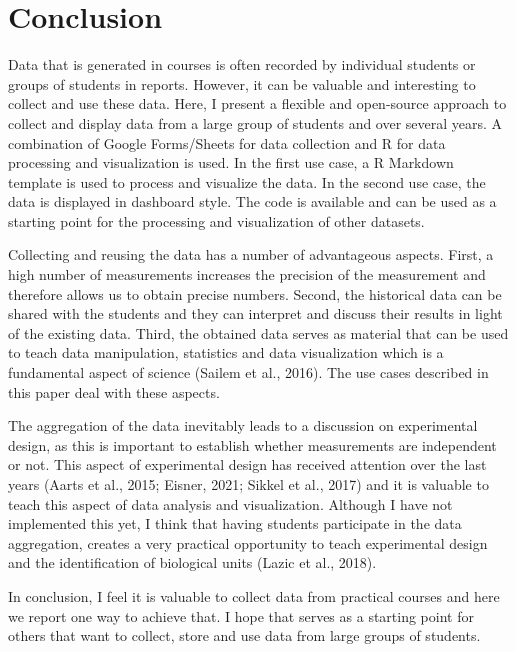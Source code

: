 \documentclass[
]{agujournal2019}
\begin{document}
\hypertarget{sec-conclusion}{%
\section*{Conclusion}\label{sec-conclusion}}

Data that is generated in courses is often recorded by individual
students or groups of students in reports. However, it can be valuable
and interesting to collect and use these data. Here, I present a
flexible and open-source approach to collect and display data from a
large group of students and over several years. A combination of Google
Forms/Sheets for data collection and R for data processing and
visualization is used. In the first use case, a R Markdown template is
used to process and visualize the data. In the second use case, the data
is displayed in dashboard style. The code is available and can be used
as a starting point for the processing and visualization of other
datasets.

Collecting and reusing the data has a number of advantageous aspects.
First, a high number of measurements increases the precision of the
measurement and therefore allows us to obtain precise numbers. Second,
the historical data can be shared with the students and they can
interpret and discuss their results in light of the existing data.
Third, the obtained data serves as material that can be used to teach
data manipulation, statistics and data visualization which is a
fundamental aspect of science (Sailem et al., 2016). The use cases
described in this paper deal with these aspects.

The aggregation of the data inevitably leads to a discussion on
experimental design, as this is important to establish whether
measurements are independent or not. This aspect of experimental design
has received attention over the last years (Aarts et al., 2015; Eisner,
2021; Sikkel et al., 2017) and it is valuable to teach this aspect of
data analysis and visualization. Although I have not implemented this
yet, I think that having students participate in the data aggregation,
creates a very practical opportunity to teach experimental design and
the identification of biological units (Lazic et al., 2018).

In conclusion, I feel it is valuable to collect data from practical
courses and here we report one way to achieve that. I hope that serves
as a starting point for others that want to collect, store and use data
from large groups of students.
\end{document}
